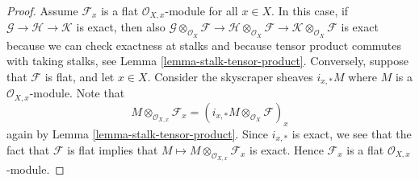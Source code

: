 \documentclass[10pt,a4paper]{amsart}
\theoremstyle{plain}
\theoremstyle{definition}
\theoremstyle{remark}
\numberwithin{equation}{subsection}
\begin{document}
\begin{proof}
Assume $\mathcal{F}_x$ is a flat $\mathcal{O}_{X, x}$-module for all
$x \in X$. In this case, if $\mathcal{G} \to \mathcal{H} \to \mathcal{K}$
is exact, then also
$\mathcal{G} \otimes_{\mathcal{O}_X} \mathcal{F} \to
\mathcal{H} \otimes_{\mathcal{O}_X} \mathcal{F} \to
\mathcal{K} \otimes_{\mathcal{O}_X} \mathcal{F}$
is exact because we can check exactness at stalks and because
tensor product commutes with taking stalks, see
Lemma \ref{lemma-stalk-tensor-product}.
Conversely, suppose that $\mathcal{F}$ is flat, and let $x \in X$.
Consider the skyscraper sheaves $i_{x, *} M$ where $M$ is a
$\mathcal{O}_{X, x}$-module. Note that
$$
M \otimes_{\mathcal{O}_{X, x}} \mathcal{F}_x =
\left(i_{x, *} M \otimes_{\mathcal{O}_X} \mathcal{F}\right)_x
$$
again by
Lemma \ref{lemma-stalk-tensor-product}.
Since $i_{x, *}$ is exact, we see that the fact that $\mathcal{F}$
is flat implies that $M \mapsto M \otimes_{\mathcal{O}_{X, x}} \mathcal{F}_x$
is exact. Hence $\mathcal{F}_x$ is a flat $\mathcal{O}_{X, x}$-module.
\end{proof}
\end{document}
